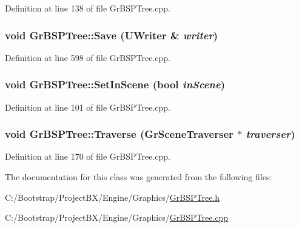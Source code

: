 Definition at line 138 of file GrBSPTree.cpp.\hypertarget{class_gr_b_s_p_tree_2c1454dfcd96cd85143d86f4fa5bb099}{
\subsubsection[{Save}]{\setlength{\rightskip}{0pt plus 5cm}void GrBSPTree::Save ({\bf UWriter} \& {\em writer})}}
\label{class_gr_b_s_p_tree_2c1454dfcd96cd85143d86f4fa5bb099}




Definition at line 598 of file GrBSPTree.cpp.\hypertarget{class_gr_b_s_p_tree_e6c5ef163373e38cf35a23177974dc66}{
\subsubsection[{SetInScene}]{\setlength{\rightskip}{0pt plus 5cm}void GrBSPTree::SetInScene (bool {\em inScene})}}
\label{class_gr_b_s_p_tree_e6c5ef163373e38cf35a23177974dc66}




Definition at line 101 of file GrBSPTree.cpp.\hypertarget{class_gr_b_s_p_tree_f880f4a1b8a4ebb0b58df5f923d492b7}{
\subsubsection[{Traverse}]{\setlength{\rightskip}{0pt plus 5cm}void GrBSPTree::Traverse ({\bf GrSceneTraverser} $\ast$ {\em traverser})}}
\label{class_gr_b_s_p_tree_f880f4a1b8a4ebb0b58df5f923d492b7}




Definition at line 170 of file GrBSPTree.cpp.

The documentation for this class was generated from the following files:\begin{CompactItemize}
\item 
C:/Bootstrap/ProjectBX/Engine/Graphics/\hyperlink{_gr_b_s_p_tree_8h}{GrBSPTree.h}\item 
C:/Bootstrap/ProjectBX/Engine/Graphics/\hyperlink{_gr_b_s_p_tree_8cpp}{GrBSPTree.cpp}\end{CompactItemize}
